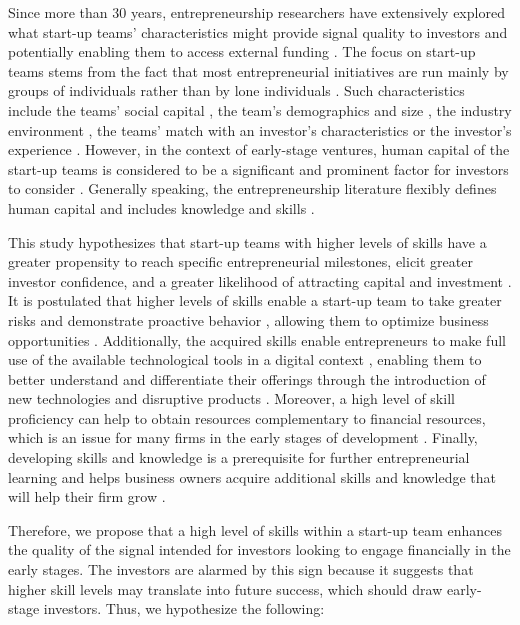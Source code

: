 \documentclass[12pt]{article}
\begin{document}
Since more than 30 years, entrepreneurship researchers have extensively explored what start-up teams' characteristics might provide signal quality to investors and potentially enabling them to access external funding \citep{roure1990predictors}. The focus on start-up teams stems from the fact that most entrepreneurial initiatives are run mainly by groups of individuals rather than by lone individuals \citep{klotz2014new}. Such characteristics include the teams' social capital \citep{shane2002network}, the team's demographics and size \citep{eisenhardt1990organizational}, the industry environment \citep{townsend2015turning}, the teams' match with an investor's characteristics \citep{aggarwal2015evaluating} or the investor's experience \citep{franke2008venture}. However, in the context of early-stage ventures, human capital of the start-up teams is considered to be a significant and prominent factor for investors to consider \citep{beckman2007early, ko2018signaling, matusik2008values}. Generally speaking, the entrepreneurship literature flexibly defines human capital and includes knowledge and skills \citep{becker1964human, marvel2016human}.

This study hypothesizes that start-up teams with higher levels of skills have a greater propensity to reach specific entrepreneurial milestones, elicit greater investor confidence, and a greater likelihood of attracting capital and investment \citep{zarutskie2010role}. It is postulated that higher levels of skills enable a start-up team to take greater risks and demonstrate proactive behavior \citep{becherer1999proactive}, allowing them to optimize business opportunities \citep{shane2000promise, chandler1994founder}. Additionally, the acquired skills enable entrepreneurs to make full use of the available technological tools in a digital context \citep{nambisan2017digital}, enabling them to better understand and differentiate their offerings through the introduction of new technologies and disruptive products \citep{marvel2007technology}. Moreover, a high level of skill proficiency can help to obtain resources complementary to financial resources, which is an issue for many firms in the early stages of development \citep{beckman2007early}. Finally, developing skills and knowledge is a prerequisite for further entrepreneurial learning and helps business owners acquire additional skills and knowledge that will help their firm grow \citep{hunter1986cognitive}.

Therefore, we propose that a high level of skills within a start-up team enhances the quality of the signal intended for investors looking to engage financially in the early stages. The investors are alarmed by this sign because it suggests that higher skill levels may translate into future success, which should draw early-stage investors. Thus, we hypothesize the following: \\
\end{document}
